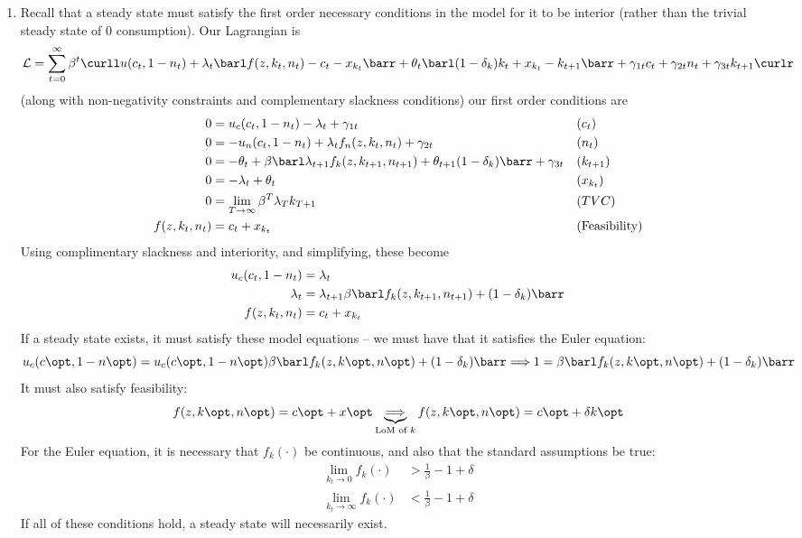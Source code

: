 \documentclass[10pt]{article}
\begin{document}
\begin{enumerate}
	\item Recall that a steady state must satisfy the first order necessary conditions in the model for it to be interior (rather than the trivial steady state of 0 consumption). Our Lagrangian is \[\mathcal{L} = \sum_{t=0}^\infty \beta^t \curll u(c_t,1-n_t) + \lambda_t\barl f(z,k_t,n_t) - c_t - x_{k_t}\barr + \theta_t \barl (1-\delta_k)k_t + x_{k_t} - k_{t+1}\barr + \gamma_{1t}c_t + \gamma_{2t}n_t + \gamma_{3t}k_{t+1} \curlr\](along with non-negativity constraints and complementary slackness conditions) our first order conditions are \begin{align*} 0 &= u_c(c_t,1-n_t) - \lambda_t +\gamma_{1t} &&(c_t) \\ 0 &= -u_n(c_t,1-n_t) +\lambda_t f_n(z,k_t,n_t)+ \gamma_{2t} &&(n_t)\\ 0 &= -\theta_t + \beta \barl\lambda_{t+1} f_k(z,k_{t+1},n_{t+1}) + \theta_{t+1}(1-\delta_k)\barr + \gamma_{3t} &&(k_{t+1}) \\ 0 &= -\lambda_t + \theta_t &&(x_{k_t})\\ 0 &= \lim_{T\to\infty} \beta^T \lambda_T k_{T+1} &&(TVC) \\ f(z,k_t,n_t) &= c_t + x_{k_t} &&(\text{Feasibility})\end{align*} Using complimentary slackness and interiority, and simplifying, these become \begin{align*} u_c(c_t,1-n_t)&= \lambda_t \\ \lambda_t &= \lambda_{t+1} \beta \barl f_k(z,k_{t+1},n_{t+1}) + (1-\delta_k)\barr \\f(z,k_t,n_t) &= c_t + x_{k_t} \end{align*} If a steady state exists, it must satisfy these model equations -- we must have that it satisfies the Euler equation: \[ u_c(c\opt,1-n\opt) = u_c(c\opt,1-n\opt) \beta \barl f_k(z,k\opt,n\opt) + (1-\delta_k)\barr \Longrightarrow 1 = \beta \barl f_k(z,k\opt,n\opt) + (1-\delta_k)\barr\]It must also satisfy feasibility: \[f(z,k\opt,n\opt) = c\opt + x\opt \underbrace{\Longrightarrow}_{\text{LoM of }k} f(z,k\opt,n\opt) = c\opt + \delta k\opt \] For the Euler equation, it is necessary that $f_k(\cdot)$ be continuous, and also that the standard assumptions be true: \begin{align*} \lim_{k_t\to 0} f_k(\cdot) &> \frac{1}{\beta} - 1 + \delta \\ \lim_{k_t\to \infty} f_k(\cdot) &< \frac{1}{\beta} - 1 + \delta \end{align*} If all of these conditions hold, a steady state will necessarily exist.

\end{enumerate}
\end{document}
